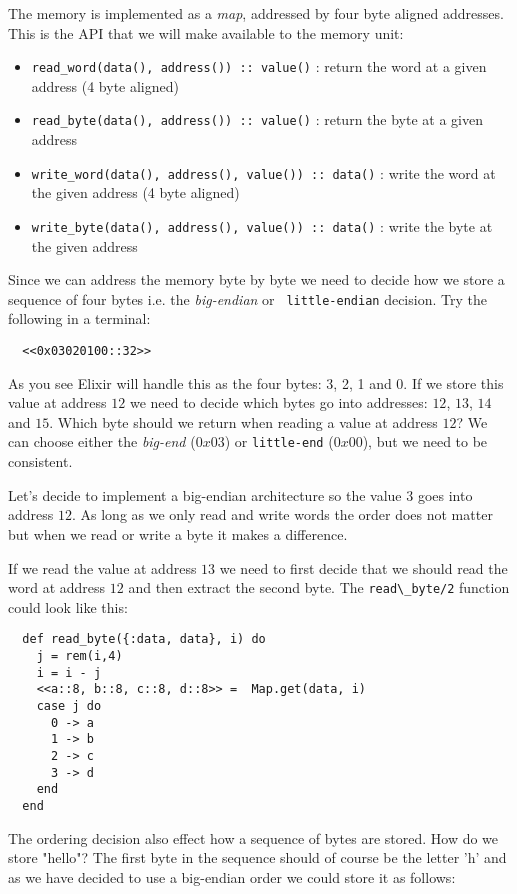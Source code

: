 \documentclass[a4paper,11pt]{article}
\begin{document}
The memory is implemented as a {\em map}, addressed by four byte
aligned addresses. This is the API that we will make available to the
memory unit:

\begin{itemize}
\item {\tt read\_word(data(), address()) :: value()} : return the word  at a given address (4 byte aligned)
\item {\tt read\_byte(data(), address()) :: value()} : return the byte at a given address  
\item {\tt write\_word(data(), address(), value()) :: data()} : write the word at the given address (4 byte aligned)
\item {\tt write\_byte(data(), address(), value()) :: data()} : write the byte at the given address
\end{itemize}

Since we can address the memory byte by byte we need to decide how we
store a sequence of four bytes i.e. the {\em big-endian} or {\tt
  little-endian} decision. Try the following in a terminal:

\begin{verbatim}
  <<0x03020100::32>>
\end{verbatim}

As you see Elixir will handle this as the four bytes: 3, 2, 1 and
0. If we store this value at address $12$ we need to decide which
bytes go into addresses: $12$, $13$, $14$ and $15$. Which byte should
we return when reading a value at address $12$? We can choose either
the {\em big-end} ($0x03$) or {\tt little-end} ($0x00$), but we need
to be consistent.

Let's decide to implement a big-endian architecture so the value $3$
goes into address $12$. As long as we only read and write words the
order does not matter but when we read or write a byte it makes a difference. 

If we read the value at address $13$ we need to first decide that we should
read the word at address $12$ and then extract the second byte. 
The \verb+read\_byte/2+ function could look like this:

\begin{verbatim}
  def read_byte({:data, data}, i) do
    j = rem(i,4)
    i = i - j
    <<a::8, b::8, c::8, d::8>> =  Map.get(data, i)
    case j do
      0 -> a
      1 -> b
      2 -> c
      3 -> d
    end
  end
\end{verbatim}

The ordering decision also effect how a sequence of bytes are
stored. How do we store "hello"? The first byte in the sequence should
of course be the letter 'h' and as we have decided to use a big-endian
order we could store it as follows:
\end{document}
